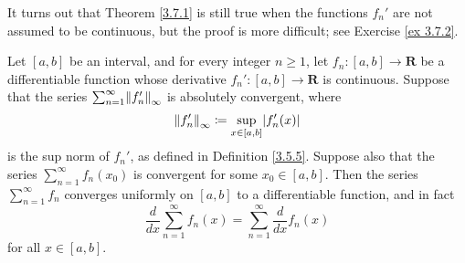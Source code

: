 \begin{remark}\label{3.7.2}
    It turns out that Theorem \ref{3.7.1} is still true when the functions \(f_n'\) are not assumed to be continuous, but the proof is more difficult;
    see Exercise \ref{ex 3.7.2}.
\end{remark}

\begin{corollary}\label{3.7.3}
    Let \([a, b]\) be an interval, and for every integer \(n \geq 1\), let \(f_n : [a, b] \to \mathbf{R}\) be a differentiable function whose derivative \(f_n' : [a, b] \to \mathbf{R}\) is continuous.
    Suppose that the series \(\sum_{n = 1}^\infty \norm*{f_n'}_\infty\) is absolutely convergent, where
    \[
        \norm*{f_n'}_\infty \coloneqq \sup_{x \in [a, b]} \abs*{f_n'(x)}
    \]
    is the sup norm of \(f_n'\), as defined in Definition \ref{3.5.5}.
    Suppose also that the series \(\sum_{n = 1}^\infty f_n(x_0)\) is convergent for some \(x_0 \in [a, b]\).
    Then the series \(\sum_{n = 1}^\infty f_n\) converges uniformly on \([a, b]\) to a differentiable function, and in fact
    \[
        \frac{d}{dx} \sum_{n = 1}^\infty f_n(x) = \sum_{n = 1}^\infty \frac{d}{dx} f_n(x)
    \]
    for all \(x \in [a, b]\).
\end{corollary}

